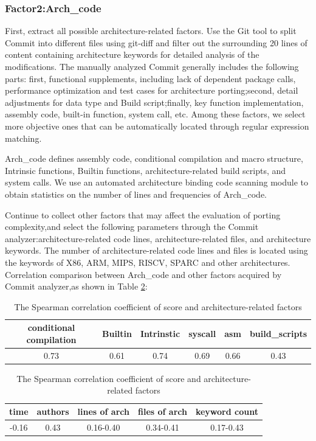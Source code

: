 \documentclass[sigconf,screen,review]{acmart}
\begin{document}
\subsubsection{Factor2:Arch\_code}

First, extract all possible architecture-related factors.
Use the Git tool to split Commit into different files using git-diff and filter out the surrounding 20 lines of content containing architecture keywords for detailed analysis of the modifications.
The manually analyzed Commit generally includes the following parts: first, functional supplements, including lack of dependent package calls, performance optimization and test cases for architecture porting;second, detail adjustments for data type and Build script;finally, key function implementation, assembly code, built-in function, system call, etc.
Among these factors, we select more objective ones that can be automatically located through regular expression matching.

Arch\_code defines assembly code, conditional compilation and macro structure, Intrinsic functions, Builtin functions, architecture-related build scripts, and system calls.
We use an automated architecture binding code scanning module to obtain statistics on the number of lines and frequencies of Arch\_code.

Continue to collect other factors that may affect the evaluation of porting complexity,and select the following parameters through the Commit analyzer:architecture-related code lines, architecture-related files, and architecture keywords.
The number of architecture-related code lines and files is located using the keywords of X86, ARM, MIPS, RISCV, SPARC and other architectures.
Correlation comparison between Arch\_code and other factors acquired by Commit analyzer,as shown in Table \ref{tab:score}:

\begin{table}
  \caption{The Spearman correlation coefficient of score and architecture-related factors}
  \label{tab:score}
  \begin{tabular}{cccccc}
    \toprule
    conditional compilation & Builtin & Intrinstic & syscall & asm & build\_scripts \\
    \midrule
    0.73 & 0.61 & 0.74 & 0.69 & 0.66 & 0.43 \\
  \bottomrule
\end{tabular}
\begin{tabular}{ccccc}
  \toprule
  time & authors & lines of arch & files of arch & keyword count \\
  \midrule
  -0.16 & 0.43 & 0.16-0.40 & 0.34-0.41 & 0.17-0.43 \\
\bottomrule
\end{tabular}
\end{table}
\end{document}
